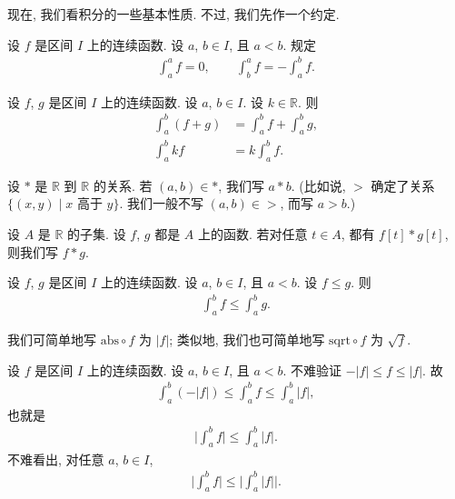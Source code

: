 现在, 我们看积分的一些基本性质. 不过, 我们先作一个约定.

\begin{definition}
    设 $f$ 是区间 $I$ 上的连续函数. 设 $a$, $b \in I$, 且 $a < b$. 规定
    \begin{align*}
        \int_{a}^{a} {f} = 0, \qquad \int_{b}^{a} {f} = -\int_{a}^{b} {f}.
    \end{align*}
\end{definition}

\begin{theorem}
    设 $f$, $g$ 是区间 $I$ 上的连续函数. 设 $a$, $b \in I$. 设 $k \in \mathbb{R}$. 则
    \begin{align*}
        \int_{a}^{b} {(f + g)} & = \int_{a}^{b} {f} + \int_{a}^{b} {g}, \\
        \int_{a}^{b} {kf}      & = k \int_{a}^{b} {f}.
    \end{align*}
\end{theorem}

\begin{definition}
    设 $\ast$ 是 $\mathbb{R}$ 到 $\mathbb{R}$ 的关系. 若 $(a, b) \in {\ast}$, 我们写 $a \ast b$. (比如说, $>$ 确定了关系 $\{ (x, y) \mid \text{$x$ 高于 $y$} \}$. 我们一般不写 $(a, b) \in {>}$, 而写 $a > b$.)

    设 $A$ 是 $\mathbb{R}$ 的子集. 设 $f$, $g$ 都是 $A$ 上的函数. 若对任意 $t \in A$, 都有 $f[t] \ast g[t]$, 则我们写 $f \ast g$.
\end{definition}

\begin{theorem}
    设 $f$, $g$ 是区间 $I$ 上的连续函数. 设 $a$, $b \in I$, 且 $a < b$. 设 $f \leq g$. 则
    \begin{align*}
        \int_{a}^{b} {f} \leq \int_{a}^{b} {g}.
    \end{align*}
\end{theorem}

\begin{definition}
    我们可简单地写 $\mathrm{abs} \circ f$ 为 $|f|$; 类似地, 我们也可简单地写 $\mathrm{sqrt} \circ f$ 为 $\sqrt{f}$.
\end{definition}

\begin{example}
    设 $f$ 是区间 $I$ 上的连续函数. 设 $a$, $b \in I$, 且 $a < b$. 不难验证 $-|f| \leq f \leq |f|$. 故
    \begin{align*}
        \int_{a}^{b} {(-|f|)} \leq \int_{a}^{b} {f} \leq \int_{a}^{b} {|f|},
    \end{align*}
    也就是
    \begin{align*}
        \Bigg| \int_{a}^{b} {f} \Bigg| \leq \int_{a}^{b} {|f|}.
    \end{align*}
    不难看出, 对任意 $a$, $b \in I$,
    \begin{align*}
        \Bigg| \int_{a}^{b} {f} \Bigg| \leq \Bigg| \int_{a}^{b} {|f|} \Bigg|.
    \end{align*}
\end{example}

